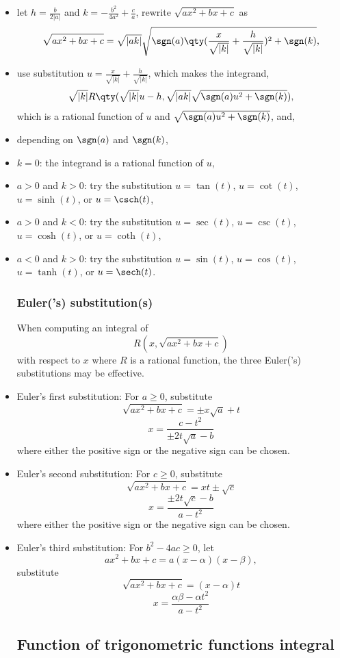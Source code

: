 \documentclass[a4paper,12pt]{report}
\begin{document}
\begin{itemize}
\begin{itemize}
\subsubsection{Square root of quadratic polynomial}
When computing an integral of
\[R\qty(x,\sqrt{ax^2+bx+c})\]
with respect to $x$ where $R$ is a rational function and $a\neq 0$, it may be effective to
\ben
\item let $h=\frac{b}{2|a|}$ and $k=-\frac{b^2}{4a^2}+\frac{c}{a}$, rewrite $\sqrt{ax^2+bx+c}$ as
\[\sqrt{ax^2+bx+c}=\sqrt{|ak|}\sqrt{\sgn(a)\qty(\frac{x}{\sqrt{|k|}}+\frac{h}{\sqrt{|k|}})^2+\sgn(k)},\]
\item use substitution $u=\frac{x}{\sqrt{|k|}}+\frac{h}{\sqrt{|k|}}$, which makes the integrand,
\[\sqrt{|k|}R\qty(\sqrt{|k|}u-h,\sqrt{|ak|}\sqrt{\sgn(a)u^2+\sgn(k)}),\]
which is a rational function of $u$ and $\sqrt{\sgn(a)u^2+\sgn(k)}$, and,
\item depending on $\sgn(a)$ and $\sgn(k)$,
\bit
\item $k=0$: the integrand is a rational function of $u$,
\item $a>0$ and $k>0$: try the substitution $u=\tan(t)$, $u=\cot(t)$, $u=\sinh(t)$, or $u=\csch(t)$,
\item $a>0$ and $k<0$: try the substitution $u=\sec(t)$, $u=\csc(t)$, $u=\cosh(t)$, or $u=\coth(t)$,
\item $a<0$ and $k>0$: try the substitution $u=\sin(t)$, $u=\cos(t)$, $u=\tanh(t)$, or $u=\sech(t)$.
\eit
\een
\subsubsection{Euler('s) substitution(s)}
When computing an integral of
\[R(x,\sqrt{ax^2+bx+c})\]
with respect to $x$ where $R$ is a rational function, the three Euler('s) substitutions may be effective.
\ben
\item Euler's first substitution: For $a\geq 0$, substitute
\[\sqrt{ax^2+bx+c}=\pm x\sqrt{a}+t\]
\[x=\frac{c-t^2}{\pm 2t\sqrt{a}-b}\]
where either the positive sign or the negative sign can be chosen.
\item Euler's second substitution: For $c\geq 0$, substitute
\[\sqrt{ax^2+bx+c}=xt\pm\sqrt{c}\]
\[x=\frac{\pm 2t\sqrt{c}-b}{a-t^2}\]
where either the positive sign or the negative sign can be chosen.
\item Euler's third substitution: For $b^2-4ac\geq 0$, let
\[ax^2+bx+c=a(x-\alpha)(x-\beta),\]
substitute
\[\sqrt{ax^2+bx+c}=(x-\alpha)t\]
\[x=\frac{\alpha\beta-\alpha t^2}{a-t^2}\]
\een
\subsection{Function of trigonometric functions integral}

\end{itemize}
\end{itemize}
\end{document}
